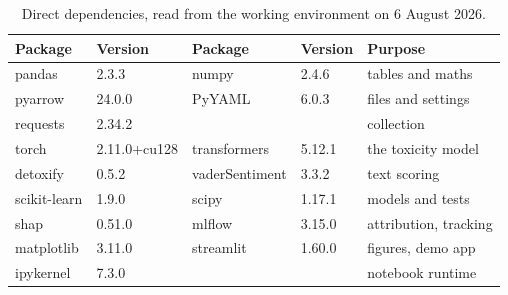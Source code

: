 \begin{table}[htbp]
\centering
\caption{Direct dependencies, read from the working environment on 6 August 2026.}
\label{tab:packages}
\small
\begin{tabular}{|p{2.9cm}|p{1.9cm}|p{2.9cm}|p{1.9cm}|p{2.4cm}|}
\hline
\textbf{Package} & \textbf{Version} & \textbf{Package} & \textbf{Version} & \textbf{Purpose} \\
\hline
pandas & 2.3.3 & numpy & 2.4.6 & tables and maths \\
\hline
pyarrow & 24.0.0 & PyYAML & 6.0.3 & files and settings \\
\hline
requests & 2.34.2 & & & collection \\
\hline
torch & 2.11.0+cu128 & transformers & 5.12.1 & the toxicity model \\
\hline
detoxify & 0.5.2 & vaderSentiment & 3.3.2 & text scoring \\
\hline
scikit-learn & 1.9.0 & scipy & 1.17.1 & models and tests \\
\hline
shap & 0.51.0 & mlflow & 3.15.0 & attribution, tracking \\
\hline
matplotlib & 3.11.0 & streamlit & 1.60.0 & figures, demo app \\
\hline
ipykernel & 7.3.0 & & & notebook runtime \\
\hline
\end{tabular}
\end{table}
